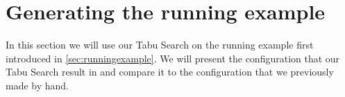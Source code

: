 \section{Generating the running example}
In this section we will use our Tabu Search on the running example first introduced in \cref{sec:runningexample}. We will present the configuration that our Tabu Search result in and compare it to the configuration that we previously made by hand.



 